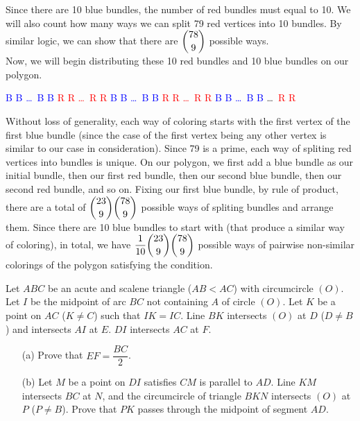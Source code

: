 \documentclass[11pt]{article}
\begin{document}
\begin{solution}
\begin{enumerate}
                Since there are 10 blue bundles, the number of red bundles must equal to 10. We will also count how many ways we can split 79 red vertices into 10 bundles. By similar logic, we can show that there are \(\dbinom{78}{9}\) possible ways.\\
                Now, we will begin distributing these 10 red bundles and 10 blue bundles on our polygon.
                \begin{center}
                    \textcolor{blue}{B B \dots \ B B} \textcolor{red}{R R \dots \ R R} \textcolor{blue}{B B \dots \ B B} \textcolor{red}{R R \dots \ R R} \textcolor{blue}{B B \dots \ B B} \dots \ \textcolor{red}{R R} \\
                \end{center}
                Without loss of generality, each way of coloring starts with the first vertex of the first blue bundle (since the case of the first vertex being any other vertex is similar to our case in consideration). Since 79 is a prime, each way of spliting red vertices into bundles is unique. On our polygon, we first add a blue bundle as our initial bundle, then our first red bundle, then our second blue bundle, then our second red bundle, and so on. Fixing our first blue bundle, by rule of product, there are a total of \(\dbinom{23}{9} \dbinom{78}{9}\) possible ways of spliting bundles and arrange them. Since there are 10 blue bundles to start with (that produce a similar way of coloring), in total, we have \(\dfrac{1}{10} \dbinom{23}{9} \dbinom{78}{9}\) possible ways of pairwise non-similar colorings of the polygon satisfying the condition.
            \end{enumerate}
        \end{solution}

        \newpage

        \begin{problem}
            Let \(ABC\) be an acute and scalene triangle (\(AB < AC\)) with circumcircle \((O)\). Let \(I\) be the midpoint of arc \(BC\) not containing \(A\) of circle \((O)\). Let \(K\) be a point on \(AC\) (\(K \neq C\)) such that \(IK = IC\). Line \(BK\) intersects \((O)\) at \(D\) (\(D \neq B\)) and intersects \(AI\) at \(E\). \(DI\) intersects \(AC\) at \(F\).
            \begin{enumerate}
                \item[(a)] Prove that \(EF = \dfrac{BC}{2}\).
                \item[(b)] Let \(M\) be a point on \(DI\) satisfies \(CM\) is parallel to \(AD\). Line \(KM\) intersects \(BC\) at \(N\), and the circumcircle of triangle \(BKN\) intersects \((O)\) at \(P\) (\(P \neq B\)). Prove that \(PK\) passes through the midpoint of segment \(AD\).
            \end{enumerate}
        \end{problem}
\end{document}
